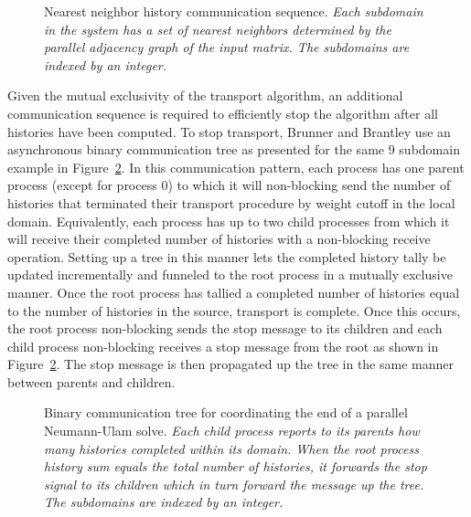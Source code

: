\documentclass{snamc2013}
\begin{document}
\begin{figure}[h!]
  \begin{center}
    \scalebox{0.7}{  }
  \end{center}
  \caption{Nearest neighbor history communication sequence.
    \textit{Each subdomain in the system has a set of nearest
      neighbors determined by the parallel adjacency graph of the
      input matrix. The subdomains are indexed by an integer.}}
  \label{fig:nearest_neighbor_comm}
\end{figure}
Given the mutual exclusivity of the transport algorithm, an additional
communication sequence is required to efficiently stop the algorithm
after all histories have been computed. To stop transport, Brunner and
Brantley use an asynchronous binary communication tree as presented
for the same 9 subdomain example in
Figure~\ref{fig:binary_comm_tree}. In this communication pattern, each
process has one parent process (except for process 0) to which it will
non-blocking send the number of histories that terminated their
transport procedure by weight cutoff in the local
domain. Equivalently, each process has up to two child processes from
which it will receive their completed number of histories with a
non-blocking receive operation. Setting up a tree in this manner lets
the completed history tally be updated incrementally and funneled to
the root process in a mutually exclusive manner. Once the root process
has tallied a completed number of histories equal to the number of
histories in the source, transport is complete. Once this occurs, the
root process non-blocking sends the stop message to its children and
each child process non-blocking receives a stop message from the root
as shown in Figure~\ref{fig:binary_comm_tree}. The stop message is
then propagated up the tree in the same manner between parents and
children.
\begin{figure}[h!]
  \begin{center}
    \scalebox{0.6}{
       }
  \end{center}
  \caption{Binary communication tree for coordinating the end of a
    parallel Neumann-Ulam solve. \textit{Each child process reports to
      its parents how many histories completed within its domain. When
      the root process history sum equals the total number of
      histories, it forwards the stop signal to its children which in
      turn forward the message up the tree. The subdomains are indexed
      by an integer.}}
  \label{fig:binary_comm_tree}
\end{figure}
\end{document}
